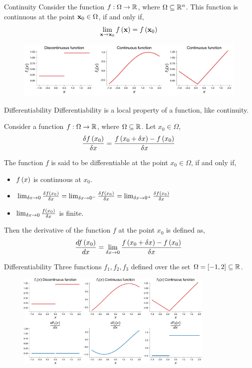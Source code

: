 \documentclass[aspectratio=169]{beamer}
\let\olditem\item
\renewcommand{\item}{\setlength{\itemsep}{\fill}\olditem}
\def\mf{\ensuremath\mathbf}
\def\mb{\ensuremath\mathbb}
\def\lp{\ensuremath\left(}
\def\rp{\ensuremath\right)}
\def\R{\ensuremath\mb{R}}
\newcommand{\ct}[1]{\lp #1\rp}
\begin{document}
\begin{frame}[t]{Continuity}
  Consider the function $f: \Omega \to \R$, where $\Omega \subseteq \R^n$. This function is continuous at the point $\mf{x}_0 \in \Omega$, if and only if, 
  \[ \lim_{\mf{x} \to \mf{x}_0} f\ct{\mf{x}} = f\ct{\mf{x}_0} \]
  
  \begin{figure}
    \centering
    \includegraphics[width=\textwidth]{figs/func_cont.pdf}
  \end{figure}
\end{frame}


\begin{frame}[t]{Differentiability}
  Differentiability is a local property of a function, like continuity. 
  
  Consider a function $f: \Omega \to \R$, where $\Omega \subseteq \R$. Let $x_0 \in \Omega$,
  \[ \frac{\delta f\ct{x_0}}{\delta x} = \frac{f\ct{x_0 + \delta x} - f\ct{x_0}}{\delta x} \]

  The function $f$ is said to be differentiable at the point $x_0 \in \Omega$, if and only if,
  \begin{itemize}
    \item $f\ct{x}$ is continuous at $x_0$.
    \item $\lim_{\delta x \to 0} \frac{\delta f\ct{x_0}}{\delta x} = \lim_{\delta x \to 0^-}\frac{\delta f\ct{x_0}}{\delta x}  = \lim_{\delta x \to 0^+} \frac{\delta f\ct{x_0}}{\delta x}$
    \item $\lim_{\delta x \to 0} \frac{f\ct{x_0}}{\delta x}$ is finite.
  \end{itemize}

  Then the derivative of the function  $f$ at the point $x_0$ is defined as,
  \[ \frac{df\ct{x_0}}{dx} = \lim_{\delta x \to 0} \frac{f\ct{x_0 + \delta x} - f\ct{x_0}}{\delta x} \]
\end{frame}


\begin{frame}[t]{Differentiability}
  Three functions $f_1, f_2, f_3$ defined over the set $\Omega = \left[ -1, 2\right] \subseteq \R$.
  
  \begin{figure}
    \centering
    \includegraphics[width=0.85\textwidth]{figs/func_diff.pdf}
  \end{figure}
\end{frame}
\end{document}
